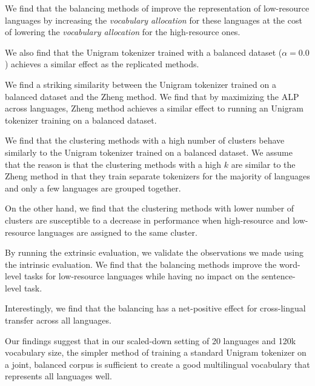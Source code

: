 We find that the balancing methods of \citet{chung_improving_2020,zheng_allocating_2021,liang_xlm-v_2023} improve the representation of low-resource languages by increasing the \textit{vocabulary allocation} for these languages at the cost of lowering the \textit{vocabulary allocation} for the high-resource ones. 

We also find that the Unigram tokenizer trained with a balanced dataset ($\alpha=0.0$) achieves a similar effect as the replicated methods. 

We find a striking similarity between the Unigram tokenizer trained on a balanced dataset and the Zheng method. We find that by maximizing the ALP across languages, Zheng method achieves a similar effect to running an Unigram tokenizer training on a balanced dataset.

We find that the clustering methods with a high number of clusters behave similarly to the Unigram tokenizer trained on a balanced dataset. We assume that the reason is that the clustering methods with a high $k$ are similar to the Zheng method in that they train separate tokenizers for the majority of languages and only a few languages are grouped together.

On the other hand, we find that the clustering methods with lower number of clusters are susceptible to a decrease in performance when high-resource and low-resource languages are assigned to the same cluster.

By running the extrinsic evaluation, we validate the observations we made using the intrinsic evaluation. We find that the balancing methods improve the word-level tasks for low-resource languages while having no impact on the sentence-level task. 

Interestingly, we find that the balancing has a net-positive effect for cross-lingual transfer across all languages.

Our findings suggest that in our scaled-down setting of 20 languages and 120k vocabulary size, the simpler method of training a standard Unigram tokenizer on a joint, balanced corpus is sufficient to create a good multilingual vocabulary that represents all languages well.



